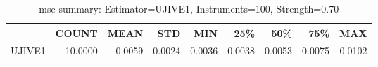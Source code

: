 \begin{table}[ht]
\centering
\caption{mse summary: Estimator=UJIVE1, Instruments=100, Strength=0.70}
\begin{tabular}{lrrrrrrrr}
\toprule
 & COUNT & MEAN & STD & MIN & 25\% & 50\% & 75\% & MAX \\
\midrule
UJIVE1 & 10.0000 & 0.0059 & 0.0024 & 0.0036 & 0.0038 & 0.0053 & 0.0075 & 0.0102 \\
\bottomrule
\end{tabular}
\end{table}
